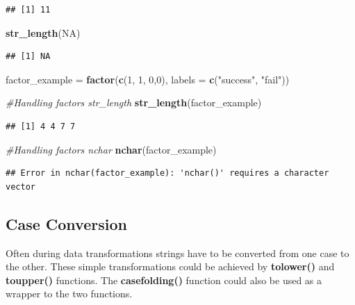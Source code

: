 \documentclass[]{book}
\newenvironment{Shaded}{\begin{snugshade}}{\end{snugshade}}
\newcommand{\KeywordTok}[1]{\textcolor[rgb]{0.13,0.29,0.53}{\textbf{{#1}}}}
\newcommand{\DataTypeTok}[1]{\textcolor[rgb]{0.13,0.29,0.53}{{#1}}}
\newcommand{\DecValTok}[1]{\textcolor[rgb]{0.00,0.00,0.81}{{#1}}}
\newcommand{\StringTok}[1]{\textcolor[rgb]{0.31,0.60,0.02}{{#1}}}
\newcommand{\CommentTok}[1]{\textcolor[rgb]{0.56,0.35,0.01}{\textit{{#1}}}}
\newcommand{\OtherTok}[1]{\textcolor[rgb]{0.56,0.35,0.01}{{#1}}}
\newcommand{\NormalTok}[1]{{#1}}
\begin{document}
\begin{verbatim}
## [1] 11
\end{verbatim}

\begin{Shaded}
\begin{Highlighting}[]
\KeywordTok{str_length}\NormalTok{(}\OtherTok{NA}\NormalTok{)}
\end{Highlighting}
\end{Shaded}

\begin{verbatim}
## [1] NA
\end{verbatim}

\begin{Shaded}
\begin{Highlighting}[]
\NormalTok{factor_example =}\StringTok{ }\KeywordTok{factor}\NormalTok{(}\KeywordTok{c}\NormalTok{(}\DecValTok{1}\NormalTok{, }\DecValTok{1}\NormalTok{, }\DecValTok{0}\NormalTok{,}\DecValTok{0}\NormalTok{), }\DataTypeTok{labels =} \KeywordTok{c}\NormalTok{(}\StringTok{"success"}\NormalTok{, }\StringTok{"fail"}\NormalTok{))}

\CommentTok{#Handling factors str_length}
\KeywordTok{str_length}\NormalTok{(factor_example)}
\end{Highlighting}
\end{Shaded}

\begin{verbatim}
## [1] 4 4 7 7
\end{verbatim}

\begin{Shaded}
\begin{Highlighting}[]
\CommentTok{#Handling factors nchar}
\KeywordTok{nchar}\NormalTok{(factor_example)}
\end{Highlighting}
\end{Shaded}

\begin{verbatim}
## Error in nchar(factor_example): 'nchar()' requires a character vector
\end{verbatim}

\subsection{Case Conversion}\label{case-conversion}

Often during data transformations strings have to be converted from one
case to the other. These simple transformations could be achieved by
\textbf{tolower()} and \textbf{toupper()} functions. The
\textbf{casefolding()} function could also be used as a wrapper to the
two functions.
\end{document}
